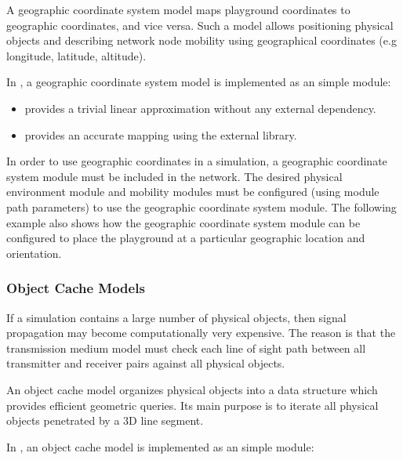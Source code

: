 A geographic coordinate system model maps playground coordinates to geographic coordinates, and vice versa. Such a model allows positioning physical objects and describing network node mobility using geographical coordinates (e.g longitude, latitude, altitude).

In \inet, a geographic coordinate system model is implemented as an \omnet simple module:

\begin{itemize}
        \item {} provides a trivial linear approximation without any external dependency.
        \item {} provides an accurate mapping using the external  library.
\end{itemize}

In order to use geographic coordinates in a simulation, a geographic coordinate system module must be included in the network. The desired physical environment module and mobility modules must be configured (using module path parameters) to use the geographic coordinate system module. The following example also shows how the geographic coordinate system module can be configured to place the playground at a particular geographic location and orientation.


\subsubsection*{Object Cache Models}
If a simulation contains a large number of physical objects, then signal propagation may become computationally very expensive. The reason is that the transmission medium model must check each line of sight path between all transmitter and receiver pairs against all physical objects.

An object cache model organizes physical objects into a data structure which provides efficient geometric queries. Its main purpose is to iterate all physical objects penetrated by a 3D line segment.

In \inet, an object cache model is implemented as an \omnet simple module:

